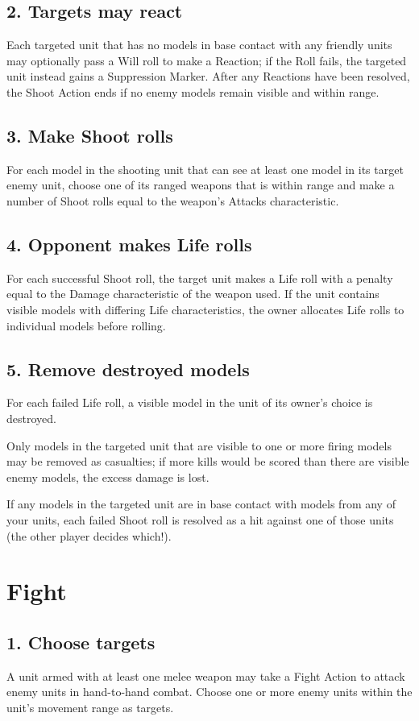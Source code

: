 \begin{multicols}{2}
\subsection*{2. Targets may react}
Each targeted unit that has no models in base contact with any friendly units may optionally pass a Will roll to make a Reaction; if the Roll fails, the targeted unit instead gains a Suppression Marker. After any Reactions have been resolved, the Shoot Action ends if no enemy models remain visible and within range.

\subsection*{3. Make Shoot rolls}
For each model in the shooting unit that can see at least one model in its target enemy unit, choose one of its ranged weapons that is within range and make a number of Shoot rolls equal to the weapon's Attacks characteristic.

\subsection*{4. Opponent makes Life rolls}
For each successful Shoot roll, the target unit makes a Life roll with a penalty equal to the Damage characteristic of the weapon used. If the unit contains visible models with differing Life characteristics, the owner allocates Life rolls to individual models before rolling.

\subsection*{5. Remove destroyed models}
For each failed Life roll, a visible model in the unit of its owner's choice is destroyed.

Only models in the targeted unit that are visible to one or more firing models may be removed as casualties; if more kills would be scored than there are visible enemy models, the excess damage is lost.

If any models in the targeted unit are in base contact with models from any of your units, each failed Shoot roll is resolved as a hit against one of those units (the other player decides which!).




\section*{Fight}
\subsection*{1. Choose targets}
A unit armed with at least one melee weapon may take a Fight Action to attack enemy units in hand-to-hand combat. Choose one or more enemy units within the unit's movement range as targets.


\end{multicols}
